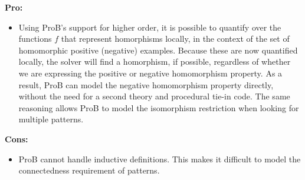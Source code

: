 \textbf{Pro:}
\begin{itemize}
  \item Using ProB's support for higher order, it is possible to quantify over the functions $f$ that represent homorphisms locally, in the context of the set of homomorphic positive (negative) examples.
  Because these are now quantified locally, the solver will find a homorphism, if possible, regardless of whether we are expressing the positive or negative homomorphism property.
  As a result, ProB can model the negative homomorphism property directly, without the need for a second theory and procedural tie-in code.
  The same reasoning allows ProB to model the isomorphism restriction when looking for multiple patterns.
\end{itemize}
\textbf{Cons:}
\begin{itemize}
  \item ProB cannot handle inductive definitions. 
  This makes it difficult to model the connectedness requirement of patterns.
\end{itemize}


%
%

